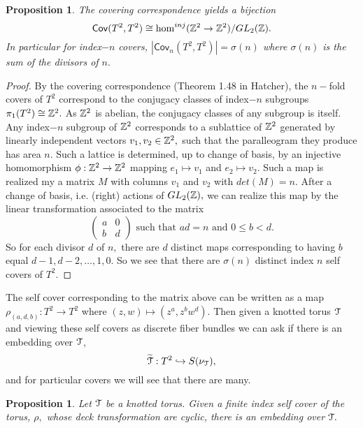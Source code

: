 \documentclass[a4paper, 12 pt, reqno]{amsart}
\newtheorem{prop}[theorem]{Proposition}
\theoremstyle{definition}
\theoremstyle{remark}
\begin{document}
\begin{prop}
The covering correspondence yields a bijection
\[
\mathsf{Cov}(T^2, T^2) \cong \hom^{inj} (\mathbb Z^2 \to \mathbb Z^2)/GL_2 (\mathbb Z).
\]
In particular for index$-n$ covers, $|\mathsf{Cov}_{n}(T^2, T^2)| = \sigma(n)$ where $\sigma(n)$ is the sum of the divisors of $n.$ 
\end{prop}


\begin{proof}
By the covering correspondence (Theorem 1.48 in Hatcher), the $n-$fold covers of $T^{2}$ correspond to the conjugacy classes of index$-n$ subgroups $\pi_{1}(T^{2}) \cong \mathbb Z^{2}.$ As $\mathbb Z^{2}$ is abelian, the conjugacy classes of any subgroup is itself. \newline  \newline Any index$-n$ subgroup of $\mathbb Z^{2}$ corresponds to a sublattice of $\mathbb Z^{2}$ generated by linearly independent vectors $v_{1}, v_{2} \in \mathbb Z^{2},$ such that the paralleogram they produce has area $n$. Such a lattice is determined, up to change of basis, by an injective homomorphism $\phi : \mathbb Z^{2} \rightarrow \mathbb Z^{2}$ mapping $e_{1} \mapsto v_{1}$ and $e_{2} \mapsto v_{2}.$ Such a map is realized my a matrix $M$ with columns $v_{1}$ and $v_{2}$ with $det(M) = n.$ After a change of basis, i.e. (right) actions of $GL_{2}(\mathbb Z),$ we can realize this map by the linear transformation associated to the matrix  
$$\begin{pmatrix}
a & 0\\
b & d 
\end{pmatrix}   \text{ such that } ad = n \text{ and } 0 \leq b < d.$$ So for each divisor $d$ of $n,$ there are $d$ distinct maps corresponding to having $b$ equal $d -1, d -2, \hdots, 1, 0.$ So we see that there are $\sigma(n)$ distinct index $n$ self covers of $T^{2}.$
\end{proof}


The self cover corresponding to the matrix above can be written as a map $\rho_{(a,d,b)}: T^{2} \rightarrow T^{2}$ where $(z, w) \mapsto (z^{a}, z^{b}w^{d}).$ Then given a knotted torus $\mathcal T$ and viewing these self covers as discrete fiber bundles we can ask if there is an embedding over $\mathcal T$,  $$\widetilde{\mathcal T}: T^{2} \hookrightarrow S(\nu_{\mathcal T}),$$ and for particular covers we will see that there are many. 


\begin{prop} %
Let $\mathcal T$ be a knotted torus. Given a finite index self cover of the torus, $\rho,$ whose deck transformation are cyclic, there is an embedding over $\mathcal T.$
\end{prop}
\end{document}
